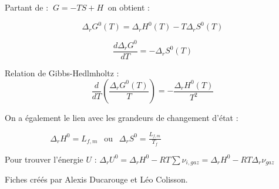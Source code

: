 \documentclass[9pt,twocolumn]{article}
\begin{document}
Partant de : $\>\boxed{G=-TS+H}\>$ on obtient :

$$\boxed{\Delta_rG^0(T)=\Delta_rH^0(T)-T\Delta_rS^0(T)}$$

$$\boxed{\dfrac{d\Delta_rG^0}{dT}=-\Delta_rS^0(T)}$$

Relation de Gibbs-Hedlmholtz :
$$\boxed{\dfrac{d}{dT}\left(\dfrac{\Delta_rG^0(T)}{T}\right)=-\dfrac{\Delta_rH^0(T)}{T^2}}$$

On a également le lien avec les grandeurs de changement d'état : 

$\>\>\>\>\>\>\>\>\>\>\>\>\>\>\>\>\>\>\>\>\>\>\>\>\>\Delta_rH^0=L_{f,m}\>\>$ ou $\>\>\Delta_rS^0=\frac{L_{f,m}}{T_f}$


\bigbreak

Pour trouver l'énergie $U$ :
\smallbreak
$\Delta_rU^0=\Delta_rH^0 - RT \sum \nu_{i,gaz}=\Delta_rH^0 - RT \Delta_r\nu_{gaz}$

\vfill
\footnotesize{Fiches créés par Alexis Ducarouge et Léo Colisson.}
\end{document}
